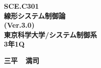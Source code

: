 \documentclass[a4paper,11pt]{jreport}
\def\mcnumber{SCE.C301}
\def\mctitle{線形システム制御論}
\def\mcdept{東京科学大学/システム制御系}
\def\mcfname{三平}
\def\mcgname{満司}
\def\mcyear{Ver.3.0}
\def\mcquoter{3年1Q}
\begin{document}
\thispagestyle{empty}
\vspace*{5cm}
\begin{center}
 \bfseries {\LARGE \mcnumber }\\[0.5cm]
 \bfseries {\Huge \mctitle }\\[0.5cm]
 \bfseries {\LARGE (\mcyear)}\\[0.5cm]
\vspace*{0.5cm}
 \bfseries {\LARGE \mcdept}\\[0.3cm]
 \bfseries {\LARGE \mcquoter}
\end{center}
\vspace*{7cm}
\begin{center}
 \Huge \bfseries  \mcfname \ \ \mcgname
\end{center}

\renewcommand{\thepage}{\roman{page}}  %

\tableofcontents{-1cm}

\newpage  %

\setcounter{page}{1}  %
\renewcommand{\thepage}{\arabic{page}}  %

\appendix


\end{document}
